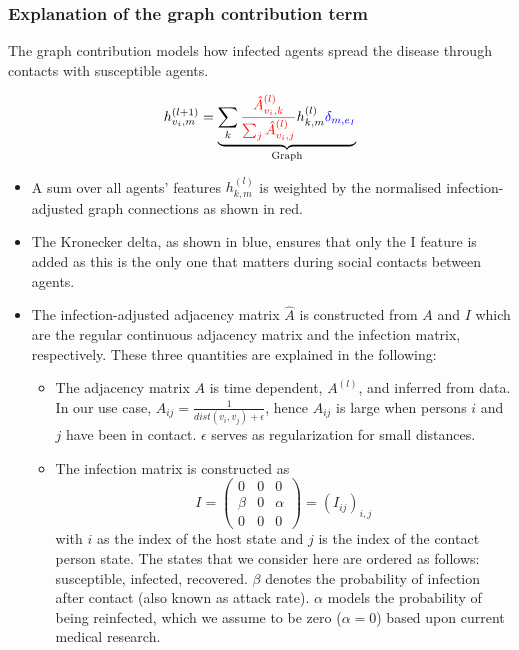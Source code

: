 \subsubsection{Explanation of the graph contribution term}
The graph contribution models how infected agents spread the disease through contacts with susceptible agents.

\begin{equation}
    h_{v_i, m}^{(l+1)}
	=
	\underbrace{
		\sum_k \textcolor{red}{\frac{\hat{A}_{v_i, k}^{(l)}}{\sum_j \hat{A}_{v_i, j}^{(l)}}} h_{k, m}^{(l)} \textcolor{blue}{\delta_{m, e_I}}
	}_{\text{Graph}}
\end{equation}

\begin{itemize}
    \item A sum over all agents' features $h_{k,m}^{(l)}$ is weighted by the normalised infection-adjusted graph connections as shown in red.
    \item The Kronecker delta, as shown in blue, ensures that only the I feature is added as this is the only one that matters during social contacts between agents.
    \item The infection-adjusted adjacency matrix $\hat{A}$ is constructed from $A$ and $I$ which are the regular continuous adjacency matrix and the infection matrix, respectively. These three quantities are explained in the following:
    \begin{itemize}
        \item The adjacency matrix $A$ is time dependent, $A^{(l)}$, and inferred from data. In our use case, $A_{ij} = \frac{1}{dist(v_i, v_j)+\epsilon}$, hence $A_{ij}$ is large when persons $i$ and $j$ have been in contact. $\epsilon$ serves as regularization for small distances.
        \item The infection matrix is constructed as
        \begin{equation}
            I =
            \begin{pmatrix}
                0     &  0  & 0 \\
                \beta &  0  & \alpha \\
                0     &  0  & 0
            \end{pmatrix}
            =
            (I_{ij})_{i,j}
        \end{equation}
        with $i$ as the index of the host state and $j$ is the index of the contact person state. The states that we consider here are ordered as follows: susceptible, infected, recovered. $\beta$ denotes the probability of infection  after contact (also known as attack rate). $\alpha$ models the probability of being reinfected, which we assume to be zero ($\alpha=0$) based upon current medical research.

\end{itemize}
\end{itemize}
